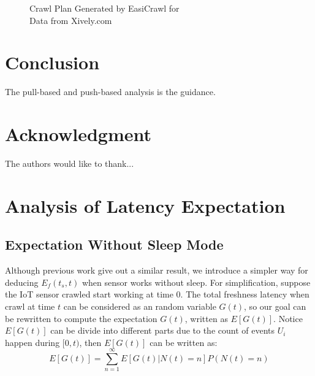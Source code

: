 \documentclass[conference]{IEEEtran}
\begin{document}
\begin{figure}
	\centering
	
	\captionsetup{justification=centering}
	\caption{Crawl Plan Generated by EasiCrawl for \\
		Data from Xively.com}
	\label{fig:xivelycasestudy}
\end{figure}


\section{Conclusion}

The pull-based and push-based analysis is the guidance.

\section*{Acknowledgment}


The authors would like to thank...


\ifCLASSOPTIONcaptionsoff
  \newpage
\fi





%
%
%
%

\appendices
\section{Analysis of Latency Expectation}

\subsection{Expectation Without Sleep Mode}
Although previous work\cite{Cho2000} give out a similar result, we introduce a simpler way for deducing $E_f(t_s, t)$ when sensor works without sleep. For simplification, suppose the IoT sensor crawled start working at time $0$. The total freshness latency when crawl at time $t$ can be considered as an random variable $G(t)$, so our goal can be rewritten to compute the expectation $G(t)$, written as $E[G(t)]$. 
Notice $E[G(t)]$ can be divide into different parts due to the count of events $U_i$ happen during $[0, t)$, then $E[G(t)]$ can be written as:
\begin{equation}
E[G(t)] = \sum_{n=1}^{\infty} E[G(t)|N(t)=n]P(N(t)=n) \label{EG}
\end{equation}
\end{document}

